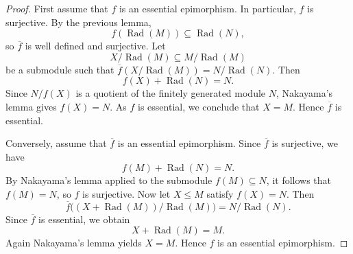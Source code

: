 \begin{proof}
    First assume that $f$ is an essential epimorphism. In particular, $f$ is surjective.
    By the previous lemma,
    \[
        f(\operatorname{Rad}(M))\subseteq \operatorname{Rad}(N),
    \]
    so $\overline{f}$ is well defined and surjective. Let
    \[
        X/\operatorname{Rad}(M)\subseteq M/\operatorname{Rad}(M)
    \]
    be a submodule such that $\overline{f}(X/\operatorname{Rad}(M))=N/\operatorname{Rad}(N)$.
    Then
    \[
        f(X)+\operatorname{Rad}(N)=N.
    \]
    Since $N/f(X)$ is a quotient of the finitely generated module $N$, Nakayama's lemma
    gives $f(X)=N$. As $f$ is essential, we conclude that $X=M$. Hence $\overline{f}$ is
    essential.

    Conversely, assume that $\overline{f}$ is an essential epimorphism. Since $\overline{f}$ is surjective, we have
    \[
        f(M)+\operatorname{Rad}(N)=N.
    \]
    By Nakayama's lemma applied to the submodule $f(M)\subseteq N$, it follows that $f(M)=N$, so $f$ is surjective. Now let $X\leq M$ satisfy $f(X)=N$. Then
    \[
        \overline{f}\bigl((X+\operatorname{Rad}(M))/\operatorname{Rad}(M)\bigr)
        =N/\operatorname{Rad}(N).
    \]
    Since $\overline{f}$ is essential, we obtain
    \[
        X+\operatorname{Rad}(M)=M.
    \]
    Again Nakayama's lemma yields $X=M$. Hence $f$ is an essential epimorphism.
\end{proof}

